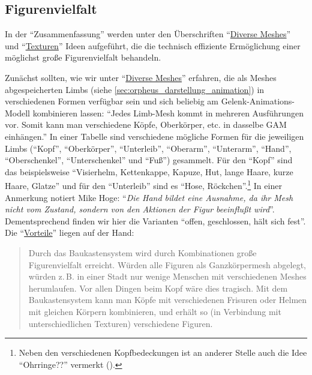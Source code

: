 \documentclass[a5paper,pagesize,numbers=noenddot]{scrbook}
\begin{document}
\subsection{Figurenvielfalt}\label{sec:orpheus_darstellung_figurenvielfalt}
In der \enquote{Zusammenfassung} werden unter den Überschriften \enquote{\uline{Diverse Meshes}} und \enquote{\uline{Texturen}} Ideen aufgeführt, die die technisch effiziente Ermöglichung einer möglichst große Figurenvielfalt behandeln.

Zunächst sollten, wie wir unter \enquote{\uline{Diverse Meshes}} erfahren, die als Meshes abgespeicherten Limbs (siehe \autoref{sec:orpheus_darstellung_animation}) in verschiedenen Formen verfügbar sein und sich beliebig am Gelenk-Animations-Modell kombinieren lassen:
\enquote{Jedes Limb-Mesh kommt in mehreren Ausführungen vor.
Somit kann man verschiedene Köpfe, Oberkörper, etc. in dasselbe GAM einhängen.}
In einer Tabelle sind verschiedene mögliche Formen für die jeweiligen Limbs (\enquote{Kopf}, \enquote{Oberkörper}, \enquote{Unterleib}, \enquote{Oberarm}, \enquote{Unterarm}, \enquote{Hand}, \enquote{Oberschenkel}, \enquote{Unterschenkel} und \enquote{Fuß}) gesammelt.
Für den \enquote{Kopf} sind das beispielsweise \enquote{Visierhelm, Kettenkappe, Kapuze, Hut, lange Haare, kurze Haare, Glatze} und für den \enquote{Unterleib} sind es \enquote{Hose, Röckchen}.\footnote{Neben den verschiedenen Kopfbedeckungen ist an anderer Stelle auch die Idee \enquote{Ohrringe??} vermerkt (\autocite[S.~8]{orpheus_b_scribbles}).}
In einer Anmerkung notiert Mike Hoge: \enquote{\textit{Die Hand bildet eine Ausnahme, da ihr Mesh nicht vom Zustand, sondern von den Aktionen der Figur beeinflußt wird}}.
Dementsprechend finden wir hier die Varianten \enquote{offen, geschlossen, hält sich fest}.
Die \enquote{\uline{Vorteile}} liegen auf der Hand:

\begin{quote}
   Durch das Baukastensystem wird durch Kombinationen große Figurenvielfalt erreicht.
   Würden alle Figuren als Ganzkörpermesh abgelegt, würden z.\,B. in einer Stadt nur wenige Menschen mit verschiedenen Meshes herumlaufen.
   Vor allen Dingen beim Kopf wäre dies tragisch.
   Mit dem Baukastensystem kann man Köpfe mit verschiedenen Frisuren oder Helmen mit gleichen Körpern kombinieren, und erhält so (in Verbindung mit unterschiedlichen Texturen) verschiedene Figuren.
\end{quote}
\end{document}
